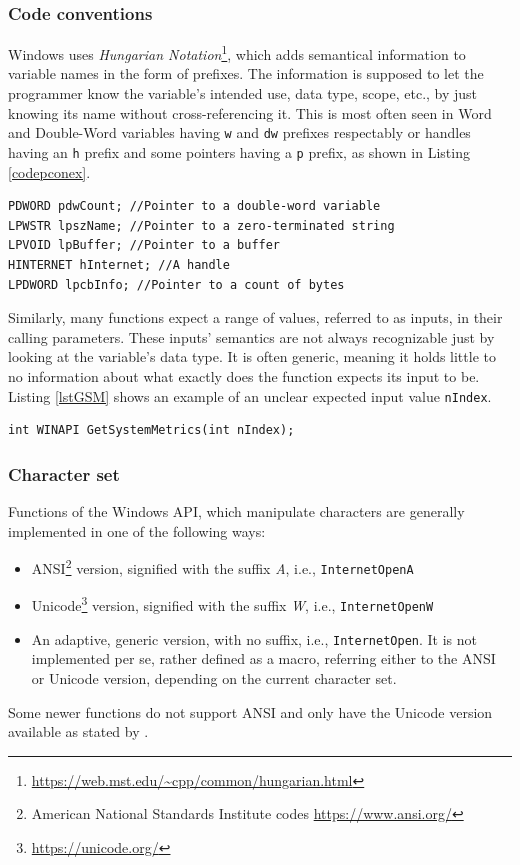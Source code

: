 \subsubsection{Code conventions}
\label{winapicodeconventions}
Windows uses \textit{Hungarian Notation}\footnote{\url{https://web.mst.edu/~cpp/common/hungarian.html}}, which adds semantical information to variable names in the form of prefixes.\cite{WinConventions} The information is supposed to let the programmer know the variable's intended use, data type, scope, etc., by just knowing its name without cross-referencing it. This is most often seen in Word and Double-Word variables having \lstinline{w} and \lstinline{dw} prefixes respectably or handles having an \lstinline{h} prefix and some pointers having a \lstinline{p} prefix, as shown in Listing \ref{codepconex}.
\begin{lstlisting}[caption={An example of hungarian notation}, label=codepconex]
PDWORD pdwCount; //Pointer to a double-word variable
LPWSTR lpszName; //Pointer to a zero-terminated string
LPVOID lpBuffer; //Pointer to a buffer
HINTERNET hInternet; //A handle
LPDWORD lpcbInfo; //Pointer to a count of bytes
\end{lstlisting}

Similarly, many functions expect a range of values, referred to as inputs, in their calling parameters. These inputs' semantics are not always recognizable just by looking at the variable's data type. It is often generic, meaning it holds little to no information about what exactly does the function expects its input to be. Listing \ref{lstGSM} shows an example of an unclear expected input value \lstinline{nIndex}.
\begin{lstlisting}[caption={The prototype of the GetSystemMetrics function. Source:\ cite{WinGetSM}},label=lstGSM]
int WINAPI GetSystemMetrics(int nIndex);
\end{lstlisting}

\subsubsection{Character set}
Functions of the Windows API, which manipulate characters are generally implemented in one of the following ways:
\begin{itemize}
    \item ANSI\footnote{American National Standards Institute codes \url{https://www.ansi.org/}} version, signified with the suffix \textit{A}, i.e., \lstinline{InternetOpenA}
    \item Unicode\footnote{\url{https://unicode.org/}} version, signified with the suffix \textit{W}, i.e., \lstinline{InternetOpenW}
    \item An adaptive, generic version, with no suffix, i.e., \lstinline{InternetOpen}. It is not implemented per se, rather defined as a macro, referring either to the ANSI or Unicode version, depending on the current character set.
\end{itemize}
Some newer functions do not support ANSI and only have the Unicode version available as stated by \cite{WinUnicode}.


